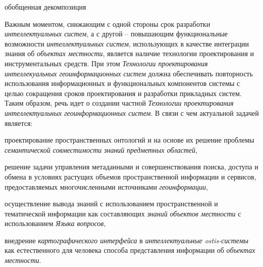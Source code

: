 \begin{SCn}
	
\begin{scnindent}
	\begin{scnrelfromset}{обобщенная декомпозиция}
	\end{scnrelfromset}
\end{scnindent}
	
\end{SCn}

Важным моментом, снижающим с одной стороны срок разработки \textit{интеллектуальных систем}, а с другой – повышающим функциональные возможности \textit{интеллектуальных систем}, использующих в качестве интеграции знания об \textit{объектах местности}, является наличие технологии проектирования и инструментальных средств. При этом \textit{Технологии проектирования интеллекуальных геоинформационных систем} должна обеспечивать повторность использования информационных и функциональных компонентов системы с целью сокращения сроков проектирования и разработки прикладных систем. Таким образом, речь идет о создании частной \textit{Технологии проектирования интеллектуальных геоинформационных систем}. В связи с чем актуальной задачей является: 
\begin{textitemize}
	\item проектирование пространственных онтологий и на основе их решение проблемы \textit{семантической совместимости} \textit{знаний} \textit{предметных областей}, 
	\item решение задачи управления метаданными и совершенствования поиска, доступа и обмена в условиях растущих объемов пространственной информации и сервисов, предоставляемых многочисленными источниками \textit{геоинформации}, 
	\item осуществление вывода знаний с использованием пространственной и тематической информации как составляющих \textit{знаний} \textit{объектов местности} с использованием \textit{Языка вопросов},
	\item внедрение \textit{картографического интерфейса} в \textit{интеллектуальные ostis-системы} как естественного для человека способа представления информации об \textit{объектах местности}.
\end{textitemize}

